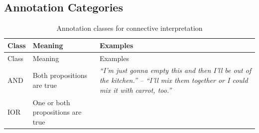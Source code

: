 \documentclass[,man,floatsintext]{apa6}
\begin{document}
\hypertarget{annotation-categories-1}{%
\subsection{Annotation Categories}\label{annotation-categories-1}}

\begin{longtable}[]{@{}lll@{}}
\caption{\label{tab:connectiveInterpretaion} Annotation classes for connective interpretation}\tabularnewline
\toprule
\begin{minipage}[b]{0.06\columnwidth}\raggedright
Class\strut
\end{minipage} & \begin{minipage}[b]{0.36\columnwidth}\raggedright
Meaning\strut
\end{minipage} & \begin{minipage}[b]{0.49\columnwidth}\raggedright
Examples\strut
\end{minipage}\tabularnewline
\midrule
\endfirsthead
\toprule
\begin{minipage}[b]{0.06\columnwidth}\raggedright
Class\strut
\end{minipage} & \begin{minipage}[b]{0.36\columnwidth}\raggedright
Meaning\strut
\end{minipage} & \begin{minipage}[b]{0.49\columnwidth}\raggedright
Examples\strut
\end{minipage}\tabularnewline
\midrule
\endhead
\begin{minipage}[t]{0.06\columnwidth}\raggedright
AND\strut
\end{minipage} & \begin{minipage}[t]{0.36\columnwidth}\raggedright
Both propositions are true\strut
\end{minipage} & \begin{minipage}[t]{0.49\columnwidth}\raggedright
\emph{\enquote{I'm just gonna empty this and then I'll be out of the kitchen.} -- \enquote{I'll mix them together or I could mix it with carrot, too.}}\strut
\end{minipage}\tabularnewline
\begin{minipage}[t]{0.06\columnwidth}\raggedright
IOR\strut
\end{minipage} & \begin{minipage}[t]{0.36\columnwidth}\raggedright
One or both propositions are true\strut
\end{minipage} & \begin{minipage}[t]{0.49\columnwidth}\raggedright

\end{minipage}
\end{longtable}
\end{document}
